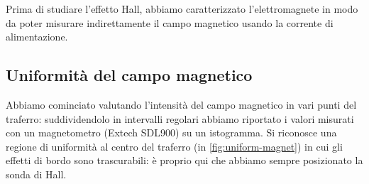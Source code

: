
Prima di studiare l'effetto Hall, abbiamo caratterizzato l'elettromagnete in modo da poter misurare indirettamente il campo magnetico usando la corrente di alimentazione.

\subsection{Uniformità del campo magnetico}

Abbiamo cominciato valutando l'intensità del campo magnetico in vari punti del traferro: suddividendolo in intervalli regolari abbiamo riportato i valori misurati con un magnetometro (Extech SDL900) su un istogramma.
Si riconosce una regione di uniformità al centro del traferro (in \cref{fig:uniform-magnet}) in cui gli effetti di bordo sono trascurabili: è proprio qui che abbiamo sempre posizionato la sonda di Hall.

